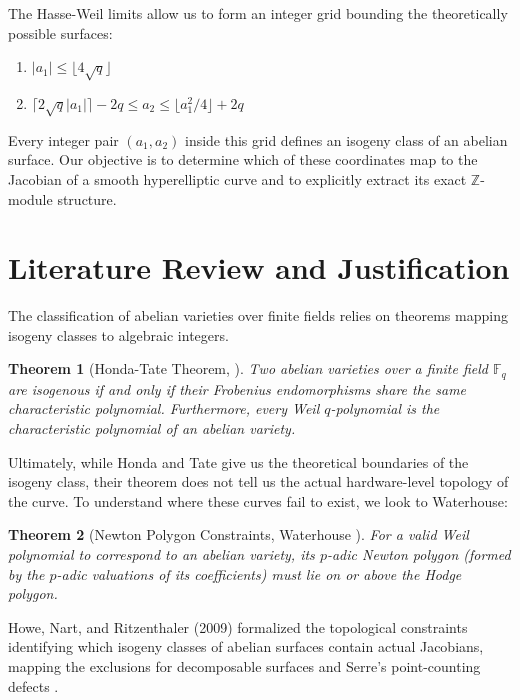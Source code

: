 \documentclass[letterpaper, 11pt]{article}
\newtheorem{theorem}{Theorem}[section]
\begin{document}
The Hasse-Weil limits allow us to form an integer grid bounding the theoretically possible surfaces:
\begin{enumerate}
    \item $|a_1| \le \lfloor 4\sqrt{q} \rfloor$
    \item $\lceil 2\sqrt{q}|a_1| \rceil - 2q \le a_2 \le \lfloor a_1^2/4 \rfloor + 2q$
\end{enumerate}
Every integer pair $(a_1, a_2)$ inside this grid defines an isogeny class of an abelian surface. Our objective is to determine which of these coordinates map to the Jacobian of a smooth hyperelliptic curve and to explicitly extract its exact $\mathbb{Z}$-module structure.

\section{Literature Review and Justification}
The classification of abelian varieties over finite fields relies on theorems mapping isogeny classes to algebraic integers. 

\begin{theorem}[Honda-Tate Theorem, \cite{Honda1968, Tate1966}]
Two abelian varieties over a finite field $\mathbb{F}_q$ are isogenous if and only if their Frobenius endomorphisms share the same characteristic polynomial. Furthermore, every Weil $q$-polynomial is the characteristic polynomial of an abelian variety.
\end{theorem}

Ultimately, while Honda and Tate give us the theoretical boundaries of the isogeny class, their theorem does not tell us the actual hardware-level topology of the curve. To understand where these curves fail to exist, we look to Waterhouse:

\begin{theorem}[Newton Polygon Constraints, Waterhouse \cite{Waterhouse1969}]
For a valid Weil polynomial to correspond to an abelian variety, its $p$-adic Newton polygon (formed by the $p$-adic valuations of its coefficients) must lie on or above the Hodge polygon.
\end{theorem}

Howe, Nart, and Ritzenthaler (2009) formalized the topological constraints identifying which isogeny classes of abelian surfaces contain actual Jacobians, mapping the exclusions for decomposable surfaces and Serre's point-counting defects \cite{Howe2009}. 
\end{document}
